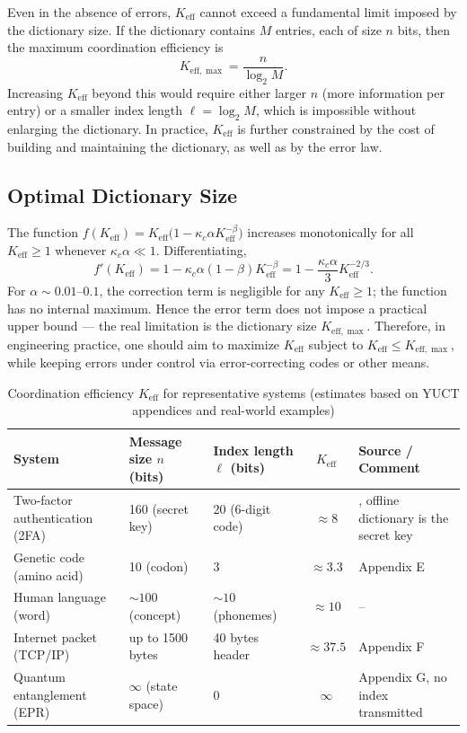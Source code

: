 \documentclass[12pt,a4paper]{article}
\theoremstyle{remark}
\newcommand{\Keff}{K_{\mathrm{eff}}}
\newcommand{\Keffmax}{K_{\mathrm{eff},\max}}
\begin{document}
	Even in the absence of errors, $\Keff$ cannot exceed a fundamental limit imposed by the dictionary size. If the dictionary contains $M$ entries, each of size $n$ bits, then the maximum coordination efficiency is
	\begin{equation}
		\Keffmax = \frac{n}{\log_2 M}. \label{eq:keff-max}
	\end{equation}
	Increasing $\Keff$ beyond this would require either larger $n$ (more information per entry) or a smaller index length $\ell = \log_2 M$, which is impossible without enlarging the dictionary. In practice, $\Keff$ is further constrained by the cost of building and maintaining the dictionary, as well as by the error law.
	
	\subsection{Optimal Dictionary Size}
	
	The function $f(\Keff) = \Keff \bigl(1 - \kappa_c \alpha K_{\mathrm{eff}}^{-\beta}\bigr)$ increases monotonically for all $\Keff \ge 1$ whenever $\kappa_c\alpha \ll 1$. Differentiating,
	\[
	f'(\Keff) = 1 - \kappa_c\alpha(1-\beta)K_{\mathrm{eff}}^{-\beta} = 1 - \frac{\kappa_c\alpha}{3} K_{\mathrm{eff}}^{-2/3}.
	\]
	For $\alpha \sim 0.01$--$0.1$, the correction term is negligible for any $\Keff \ge 1$; the function has no internal maximum. Hence the error term does not impose a practical upper bound --- the real limitation is the dictionary size $\Keffmax$. Therefore, in engineering practice, one should aim to maximize $\Keff$ subject to $\Keff \le \Keffmax$, while keeping errors under control via error-correcting codes or other means.
	
	
	\begin{table}[htbp]
		\centering
		\caption{Coordination efficiency $\Keff$ for representative systems (estimates based on YUCT appendices and real-world examples)}
		\label{tab:keff-examples}
		\footnotesize
		\begin{tabularx}{\textwidth}{XXXcX}
			\toprule
			System & Message size $n$ (bits) & Index length $\ell$ (bits) & $\Keff$ & Source / Comment \\
			\midrule
			Two-factor authentication (2FA) & 160 (secret key) & 20 (6-digit code) & $\approx 8$ & \cite{Yakushev2026b}, offline dictionary is the secret key \\
			Genetic code (amino acid) & 10 (codon) & 3 & $\approx 3.3$ & Appendix E \\
			Human language (word) & $\sim 100$ (concept) & $\sim 10$ (phonemes) & $\approx 10$ & -- \\
			Internet packet (TCP/IP) & up to 1500 bytes & 40 bytes header & $\approx 37.5$ & Appendix F \\
			Quantum entanglement (EPR) & $\infty$ (state space) & 0 & $\infty$ & Appendix G, no index transmitted \\
			\bottomrule
		\end{tabularx}
	\end{table}
	
\end{document}
